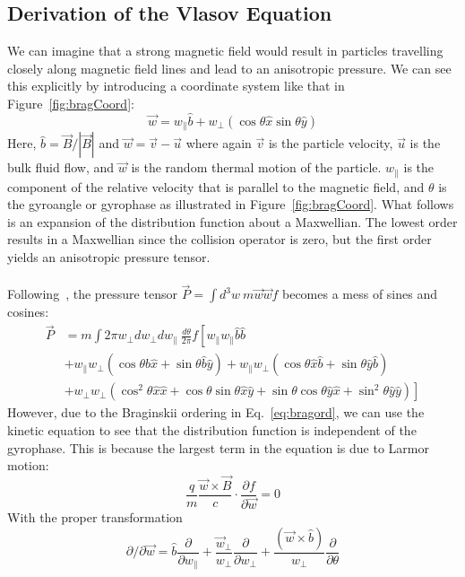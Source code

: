 \subsection{Derivation of the Vlasov Equation}\label{ssec:anisopres}
We can imagine that a strong magnetic field would result in particles travelling closely along magnetic field lines and lead to an anisotropic pressure. We can see this explicitly by introducing a coordinate system like that in Figure~\ref{fig:bragCoord}:
\begin{equation*}
  \vec w=w_{\parallel}\hat b+w_{\perp}(\cos\theta\hat x\sin\theta\hat y)
\end{equation*}
Here, $\hat b=\vec B/|\vec B|$ and $\vec w=\vec v-\vec u$ where again $\vec v$ is the particle velocity, $\vec u$ is the bulk fluid flow, and $\vec w$ is the random thermal motion of the particle. $w_{\parallel}$ is the component of the relative velocity that is parallel to the magnetic field, and $\theta$ is the gyroangle or gyrophase as illustrated in Figure~\ref{fig:bragCoord}. What follows is an expansion of the distribution function about a Maxwellian. The lowest order results in a Maxwellian since the collision operator is zero, but the first order yields an anisotropic pressure tensor. \\
\\
Following~\citet{KunzBraginskii}, the pressure tensor $\vec P=\int d^3w~m\vec w\vec w f$ becomes a mess of sines and cosines:
\begin{align*}
  \vec P&=m\int2\pi w_{\perp}dw_{\perp}dw_{\parallel}~\frac{d\theta}{2\pi} f\left[w_{\parallel}w_{\parallel}\hat b\hat b\right.\\
    &+w_{\parallel}w_{\perp}(\cos\theta\hat b\hat x+\sin\theta\hat b\hat y)+w_{\parallel}w_{\perp}(\cos\theta\hat x\hat b+\sin\theta\hat y\hat b)\\
    &\left.+w_{\perp}w_{\perp}(\cos^2\theta\hat x\hat x+\cos\theta\sin\theta\hat x\hat y+\sin\theta\cos\theta\hat y\hat x+\sin^2\theta\hat y\hat y)\right]
\end{align*}
However, due to the Braginskii ordering in Eq.~\ref{eq:bragord}, we can use the kinetic equation to see that the distribution function is independent of the gyrophase. This is because the largest term in the equation is due to Larmor motion:
\begin{equation*}
  \frac qm\frac{\vec w\times\vec B}{c}\cdot\frac{\partial f}{\partial \vec w}=0
\end{equation*}
With the proper transformation
\begin{equation}
  \partial/\partial\vec w=\hat b\frac{\partial}{\partial w_\parallel}+\frac{\vec w_\perp}{w_\perp}\frac{\partial}{\partial w_\perp}+\frac{(\vec w\times\hat b)}{w_\perp}\frac{\partial}{\partial\theta}\label{eq:wder}
\end{equation}
